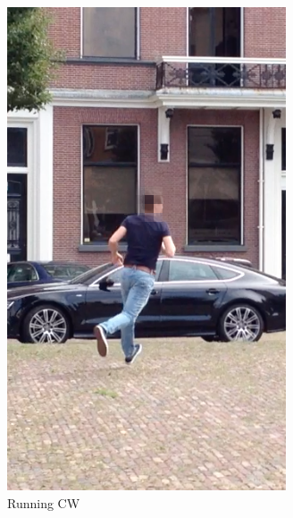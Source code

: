 \begin{figure}
\begin{subfigure}[b]{0.2\textwidth}
    \includegraphics[width=\textwidth]{./Figures/chapter6/data_collection/stills/roemer_run_cw.png}
    \caption{Running CW}
    \label{fig:stills_subject_1_running_clockwise}
  \end{subfigure}
  \qquad \qquad \qquad
  \begin{subfigure}[b]{0.2\textwidth}

\end{subfigure}
\end{figure}
